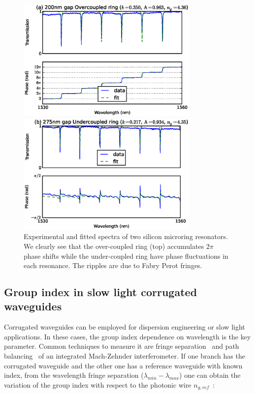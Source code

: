 \documentclass[journal]{IEEEtran}
\newcommand{\fwidthBig}{3.5in}
\begin{document}
\begin{figure}[htb]
  \centerline{\includegraphics[width=\fwidthBig]{r20g200TE_fitPhaseAmp}}
  \centerline{\includegraphics[width=\fwidthBig]{r20g275TE_fitPhaseAmp}}
  \caption{Experimental and fitted spectra of two silicon microring resonators. We clearly see that the over-coupled ring (top) accumulates $2\pi$ phase shifts while the under-coupled ring have phase fluctuations in each resonance. The ripples are due to Fabry Perot fringes.}
  \label{fig:overcoupled} %
\end{figure}

\subsection{Group index in slow light corrugated waveguides}
\label{sec:corrWaveguides}
Corrugated waveguides can be employed for dispersion engineering or slow light applications. In these cases, the group index dependence on wavelength is the key parameter. Common techniques to measure it are fringe separation~\cite{shang81,vlasov:05,yao:811,Dulkeith2006} and path balancing~\cite{Cohen:82,Knox:88,Liang:98} of an integrated Mach-Zehnder interferometer. If one branch has the corrugated waveguide and the other one has a reference waveguide with known index, from the wavelength fringe separation ($ \lambda_{min} - \lambda_{max} $) one can obtain the variation of the group index with respect to the photonic wire $ n_{g,ref} $~\cite{vlasov:05}:
\end{document}
